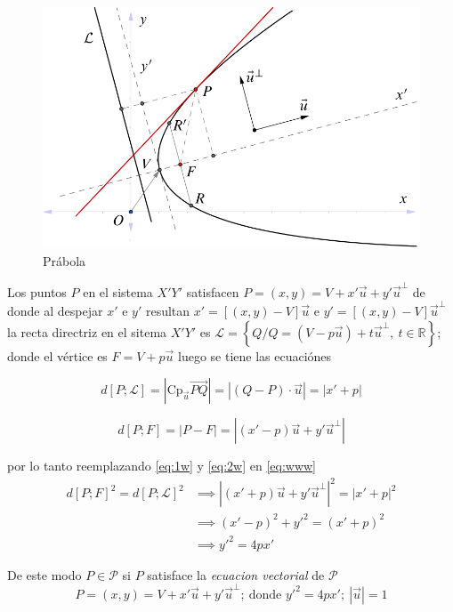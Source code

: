 \documentclass[10pt,]{krantz}
\let\oldincludegraphics\includegraphics
\renewcommand\includegraphics[2][]{%
  \oldincludegraphics[scale=0.85]{#2}
}
\theoremstyle{definition}
\theoremstyle{definition}
\theoremstyle{definition}
\theoremstyle{remark}
\begin{document}
\begin{figure}

{\centering \includegraphics{parabola} 

}

\caption{Prábola}\label{fig:hiperbola1}
\end{figure}

Los puntos \(P\) en el sistema \(X'Y'\) satisfacen
\(P=(x,y)=V+x'\vec{u}+y'\vec{u}^\perp\) de donde al despejar \(x'\) e \(y'\) resultan \(x'=[(x,y)-V]\vec{u}\) e \(y'=[(x,y)-V]\vec{u}^\perp\)
la recta directriz en el sitema \(X'Y'\) es
\(\mathcal{L}=\left\{Q/Q=(V-p\vec{u})+t\vec{u}^\perp,\:t\in \mathbb{R}\right\}\); donde el vértice es \(F=V+p\vec{u}\) luego se tiene las ecuaciónes

\begin{equation}
d[P;\mathcal{L}]=\left|\text{Cp}_{\vec{u}}\vec{PQ}\right|=\left|(Q-P)\cdot\vec{u}\right|=\left|x'+p\right|\label{eq:1w}
\end{equation}

\begin{equation}
d[P;F]=\left|P-F\right|=\left|(x'-p)\vec{u}+y'\vec{u}^{\perp}\right|\label{eq:2w}
\end{equation}

por lo tanto reemplazando \eqref{eq:1w} y \eqref{eq:2w} en \eqref{eq:www}
\begin{align*}
d\left[P;F\right]^2=d\left[P;\mathcal{L}\right]^2
& \implies \left|(x'+p)\vec{u}+y'\vec{u}^\perp\right|^2=\left|x'+p\right|^2 \\
&\implies (x'-p)^2+y'^2=(x'+p)^2\\
&\implies y'^2=4px'
\end{align*}

De este modo \(P\in\mathcal{P}\) si \(P\) satisface la \emph{ecuacion vectorial} de \(\mathcal{P}\) \[P=(x,y)=V+x'\vec{u}+y'\vec{u}^\perp;\: \text{donde } y'^2=4px'; \:\left|\vec{u}\right|=1\]
\end{document}
